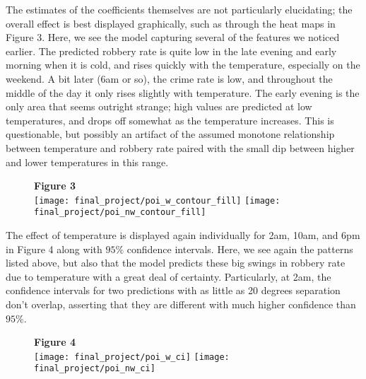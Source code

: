 \documentclass[11pt]{article}
\theoremstyle{definition}
\begin{document}
The estimates of the coefficients themselves are not particularly elucidating; the overall effect is best displayed graphically, such as through the heat maps in Figure 3. Here, we see the model capturing several of the features we noticed earlier. The predicted robbery rate is quite low in the late evening and early morning when it is cold, and rises quickly with the temperature, especially on the weekend. A bit later (6am or so), the crime rate is low, and throughout the middle of the day it only rises slightly with temperature. The early evening is the only area that seems outright strange; high values are predicted at low temperatures, and drops off somewhat as the temperature increases. This is questionable, but possibly an artifact of the assumed monotone relationship between temperature and robbery rate paired with the small dip between higher and lower temperatures in this range. \par
\begin{figure}[h]
    {\bf Figure 3} \\
    \texttt{[image: final\_project/poi\_w\_contour\_fill]}
    \texttt{[image: final\_project/poi\_nw\_contour\_fill]}
\end{figure}


The effect of temperature is displayed again individually for 2am, 10am, and 6pm in Figure 4 along with $95\%$ confidence intervals. Here, we see again the patterns listed above, but also that the model predicts these big swings in robbery rate due to temperature with a great deal of certainty. Particularly, at 2am, the confidence intervals for two predictions with as little as 20 degrees separation don't overlap, asserting that they are different with much higher confidence than $95\%$. \par

\FloatBarrier
\begin{figure}[h]
    {\bf Figure 4} \\
    \texttt{[image: final\_project/poi\_w\_ci]}
    \texttt{[image: final\_project/poi\_nw\_ci]}
\end{figure}
\end{document}
